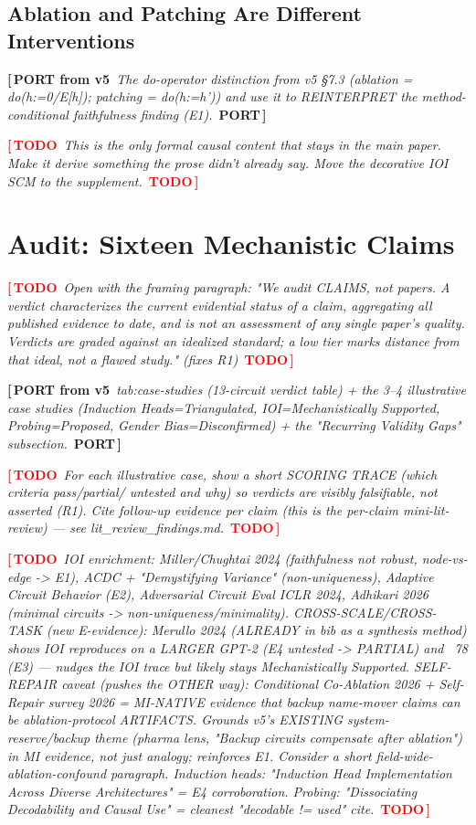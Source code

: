 \documentclass{article}
\newcommand{\TODO}[1]{\par\smallskip\noindent\textcolor{red}{\textbf{[\,TODO}}\ \textit{\textcolor{black!65}{#1}}\ \textcolor{red}{\textbf{TODO\,]}}\par\smallskip}
\newcommand{\PORT}[1]{\par\smallskip\noindent\textcolor{blue!65!black}{\textbf{[\,PORT from v5}}\ \textit{\textcolor{black!65}{#1}}\ \textcolor{blue!65!black}{\textbf{PORT\,]}}\par\smallskip}
\begin{document}
\subsection{Ablation and Patching Are Different Interventions}
\PORT{The do-operator distinction from v5 \S7.3 (ablation = do(h:=0/E[h]); patching =
do(h:=h')) and use it to REINTERPRET the method-conditional faithfulness finding (E1).}
\TODO{This is the only formal causal content that stays in the main paper. Make it derive
something the prose didn't already say. Move the decorative IOI SCM to the supplement.}

\section{Audit: Sixteen Mechanistic Claims}
\label{sec:case-studies}
\TODO{Open with the framing paragraph: "We audit CLAIMS, not papers. A verdict characterizes
the current evidential status of a claim, aggregating all published evidence to date, and is
not an assessment of any single paper's quality. Verdicts are graded against an idealized
standard; a low tier marks distance from that ideal, not a flawed study." (fixes R1)}
\PORT{tab:case-studies (13-circuit verdict table) + the 3--4 illustrative case studies
(Induction Heads=Triangulated, IOI=Mechanistically Supported, Probing=Proposed,
Gender Bias=Disconfirmed) + the "Recurring Validity Gaps" subsection.}
\TODO{For each illustrative case, show a short SCORING TRACE (which criteria pass/partial/
untested and why) so verdicts are visibly falsifiable, not asserted (R1). Cite follow-up
evidence per claim (this is the per-claim mini-lit-review) --- see lit_review_findings.md.}
\TODO{IOI enrichment: Miller/Chughtai 2024 (faithfulness not robust, node-vs-edge -> E1), ACDC +
"Demystifying Variance" (non-uniqueness), Adaptive Circuit Behavior (E2), Adversarial Circuit Eval
ICLR 2024, Adhikari 2026 (minimal circuits -> non-uniqueness/minimality).
CROSS-SCALE/CROSS-TASK (new E-evidence): Merullo 2024 (ALREADY in bib as a synthesis method) shows
IOI reproduces on a LARGER GPT-2 (E4 untested -> PARTIAL) and ~78%
(E3) --- nudges the IOI trace but likely stays Mechanistically Supported.
SELF-REPAIR caveat (pushes the OTHER way): Conditional Co-Ablation 2026 + Self-Repair survey 2026
= MI-NATIVE evidence that backup name-mover claims can be ablation-protocol ARTIFACTS. Grounds v5's
EXISTING system-reserve/backup theme (pharma lens, "Backup circuits compensate after ablation") in
MI evidence, not just analogy; reinforces E1. Consider a short field-wide-ablation-confound paragraph.
Induction heads: "Induction Head Implementation Across Diverse Architectures" = E4 corroboration.
Probing: "Dissociating Decodability and Causal Use" = cleanest "decodable != used" cite.}
\end{document}
